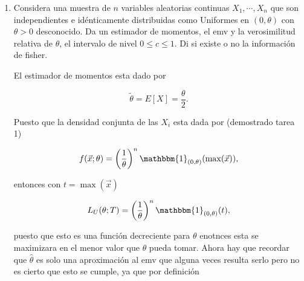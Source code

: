 \documentclass[letterpaper]{article}
\theoremstyle{definition}
\theoremstyle{lemathm}
\theoremstyle{lemathm}
\newtheorem{sol}{Solución}
\theoremstyle{lemathm}
\theoremstyle{lemademthm}
\newcommand{\pars}[1]{\left( #1 \right) }
\newcommand{\bracs}[1]{\left[ #1 \right] }
\newcommand{\1}{\mathbbm{1}}
\begin{document}
\begin{enumerate}
\begin{enumerate}
\begin{sol}
				\[I_{\hat{\mu}\hat{\alpha}} = \begin{pmatrix}
					\frac{n\hat{\alpha}}{t_1^2} & 0\\
					0 & n\pars{\pars{\frac{\Gamma(\hat{\alpha})\Gamma^{(2)}\pars{\hat{\alpha}}-\pars{\Gamma'\pars{\hat{\alpha}}}^2}{\pars{\Gamma\pars{\hat{\alpha}}}^2}}-\frac{1}{\alpha}}
				\end{pmatrix},\]

				al ser una matriz diagonal la matriz inversa $I_{\hat{\mu}\hat{\alpha}}^{-1}$ solo tendra como entrada $(i,i)$ el inverso de la entrada $(i,i)$ de la matriz $I_{\hat{\mu}\hat{\alpha}}$, luego como las informaciones individuales están dadas por el inverso de la entrada $(i,i)$ de la matriz $I_{\hat{\mu}\hat{\alpha}}^{-1}$ entonces concluimos que las informaciones individuales están dadas por las entradas $(i,i)$ de la matriz $I_{\hat{\mu}\hat{\alpha}}$, es decir

				\[I_{\hat{\mu}} = \frac{n\hat{\alpha}}{t_1^2},\]
				\[I_{\hat{\mu}} = n\pars{\pars{\frac{\Gamma(\hat{\alpha})\Gamma^{(2)}\pars{\hat{\alpha}}-\pars{\Gamma'\pars{\hat{\alpha}}}^2}{\pars{\Gamma\pars{\hat{\alpha}}}^2}}-\frac{1}{\alpha}}.\]

			\end{sol}

		\end{enumerate}

		\item Considera una muestra de $n$ variables aleatorias continuas $X_1,\cdots,X_n$ que son independientes e idénticamente distribuidas como Uniformes en $(0,\theta)$ con $\theta > 0$ desconocido. Da un estimador de momentos, el emv y la verosimilitud relativa de $\theta$, el intervalo de nivel $0\leq c\leq 1$. Di si existe o no la información de fisher.
		
		El estimador de momentos esta dado por

		\[\tilde{\theta} = E\bracs{X} = \frac{\theta}{2}.\]

		Puesto que la densidad conjunta de las $X_i$ esta dada por (demostrado tarea 1)

		\[f(\vec{x};\theta) = \pars{\frac{1}{\theta}}^n \1_{\pars{0,\theta}}(\max(\vec{x})),\]

		entonces con $t = \max(\vec{x})$

		\[L_U(\theta;T) = \pars{\frac{1}{\theta}}^n \1_{\pars{0,\theta}}(t),\]

		puesto que esto es una función decreciente para $\theta$ enotnces esta se maximizara en el menor valor que $\theta$ pueda tomar. Ahora hay que recordar que $\hat{\theta}$ es solo una aproximación al emv que alguna veces resulta serlo pero no es cierto que esto se cumple, ya que por definición


\end{enumerate}
\end{document}
